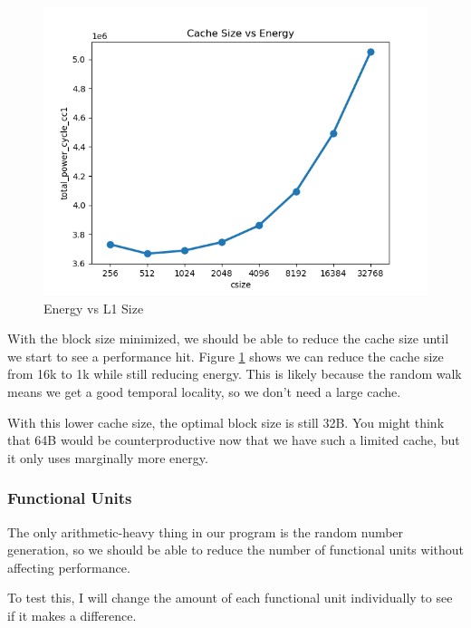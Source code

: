 \documentclass{article}
\begin{document}
\begin{multicols}{2}
  \begin{figure}[H]
    \centering
    \includegraphics[width=\linewidth]{./assets/l1csize_vs_energy.png}
    \caption{Energy vs L1 Size}
    \label{fig:l1size_vs_energy2}
  \end{figure}

  With the block size minimized, we should be able to reduce the cache size until we start to see a performance hit. Figure \ref{fig:l1size_vs_energy2} shows we can reduce the cache size from 16k to 1k while still reducing energy. This is likely because the random walk means we get a good temporal locality, so we don't need a large cache.

  With this lower cache size, the optimal block size is still 32B. You might think that 64B would be counterproductive now that we have such a limited cache, but it only uses marginally more energy.

  \subsubsection{Functional Units}
  The only arithmetic-heavy thing in our program is the random number generation, so we should be able to reduce the number of functional units without affecting performance.

  To test this, I will change the amount of each functional unit individually to see if it makes a difference.


\end{multicols}
\end{document}

